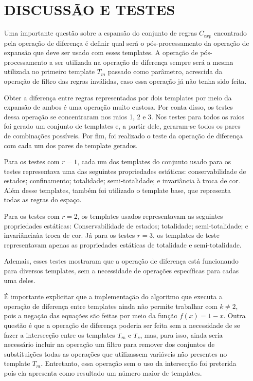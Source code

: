 \section{DISCUSSÃO E TESTES}
Uma importante questão sobre a espansão do conjunto de regras $C_{exp}$ encontrado pela operação de diferença é definir qual será o pós-processamento da operação de expansão que deve ser usado com esses templates. A operação de pós-processamento a ser utilizada na operação de diferença sempre será a mesma utilizada no primeiro template $T_m$ passado como parâmetro, acrescida da operação de filtro das regras inválidas, caso essa operação já não tenha sido feita.

Obter a diferença entre regras representadas por dois templates por meio da expansão de ambos é uma operação muito custosa. Por conta disso, os testes dessa operação se concentraram nos raios 1, 2 e 3. Nos testes para todos os raios foi gerado um conjunto de templates e, a partir dele, geraram-se todos os pares de combinações possíveis. Por fim, foi realizado o teste da operação de diferença com cada um dos pares de template gerados.

Para os testes com $r = 1$, cada um dos templates do conjunto usado para os testes representava uma das seguintes propriedades estáticas: conservabilidade de estados; confinamento; totalidade; semi-totalidade; e invariância  à troca de cor. Além desse templates, também foi utilizado o template base, que representa todas as regras do espaço.

Para os testes com $r = 2$, os templates usados representavam as seguintes propriedades estáticas: Conservabilidade de estados; totalidade; semi-totalidade; e invariânciaàa troca de cor. Já para os testes $r = 3$, os templates de teste representavam apenas as propriedades estáticas de totalidade e semi-totalidade.

Ademais, esses testes mostraram que a operação de diferença está funcionando para diversos templates, sem a necessidade de operações específicas para cadas uma deles.

É importante explicitar que a implementação do algoritmo que executa a operação de diferença entre templates ainda não permite trabalhar com $k\neq 2$, pois a negação das equações são feitas por meio da função $f(x) = 1 - x$. Outra questão é que a operação de diferença poderia ser feita sem a necessidade de se fazer a intersecção entre os templates $T_m$ e $T_s$, mas, para isso, ainda seria necessário incluir na operação um filtro para remover dos conjuntos de substituições todas as operações que utilizassem variáveis não presentes no template $T_m$. Entretanto, essa operação sem o uso da intersecção foi preterida pois ela apresenta como resultado um número maior de templates.  

